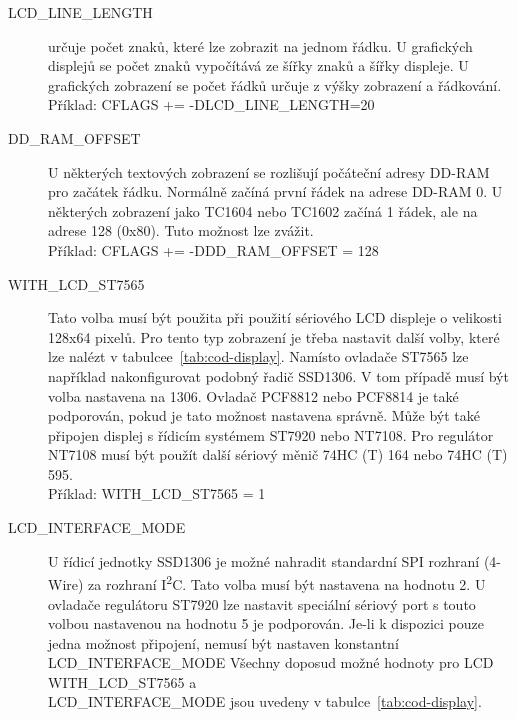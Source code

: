 \begin{description}
  \item[LCD\_LINE\_LENGTH]  určuje počet znaků, které lze zobrazit na jednom řádku. 
U grafických displejů se počet znaků vypočítává ze šířky znaků a šířky displeje.
U grafických zobrazení se počet řádků určuje z výšky zobrazení a řádkování.\\
Příklad: CFLAGS += -DLCD\_LINE\_LENGTH=20

  \item[DD\_RAM\_OFFSET] U některých textových zobrazení se rozlišují počáteční adresy DD-RAM pro začátek řádku. Normálně začíná první řádek na adrese DD-RAM 0.
U některých zobrazení jako TC1604 nebo TC1602 začíná 1 řádek, ale na adrese 128 (0x80).
Tuto možnost lze zvážit.\\
Příklad: CFLAGS += -DDD\_RAM\_OFFSET = 128

  \item[WITH\_LCD\_ST7565] Tato volba musí být použita při použití sériového LCD displeje o velikosti 128x64 pixelů.
Pro tento typ zobrazení je třeba nastavit další volby, které lze nalézt v tabulcee~\ref{tab:cod-display}.
Namísto ovladače ST7565 lze například nakonfigurovat podobný řadič SSD1306.
V tom případě musí být volba nastavena na 1306.
Ovladač PCF8812 nebo PCF8814 je také podporován, pokud je tato možnost nastavena správně.
Může být také připojen displej s řídicím systémem ST7920 nebo NT7108.
Pro regulátor NT7108 musí být použít další sériový měnič 74HC (T) 164 nebo 74HC (T) 595.\\
Příklad: WITH\_LCD\_ST7565 = 1 

 \item[LCD\_INTERFACE\_MODE] U řídicí jednotky SSD1306 je možné nahradit standardní 
SPI rozhraní (4-Wire) za rozhraní I\textsuperscript{2}C.
Tato volba musí být nastavena na hodnotu 2.
U ovladače regulátoru ST7920 lze nastavit speciální sériový port s touto volbou nastavenou
na hodnotu 5 je podporován.
Je-li k dispozici pouze jedna možnost připojení, nemusí být nastaven konstantní LCD\_INTERFACE\_MODE 
Všechny doposud možné hodnoty pro LCD \\ WITH\_LCD\_ST7565 a\\ LCD\_INTERFACE\_MODE jsou
uvedeny v tabulce~\ref{tab:cod-display}.


\end{description}
